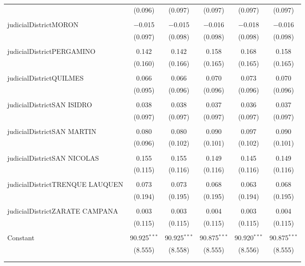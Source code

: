 \documentclass{article}
\begin{document}
\begin{table}[!htbp]
{\begin{tabular}{@{\extracolsep{5pt}}lccccc}
  & (0.096) & (0.097) & (0.097) & (0.097) & (0.097) \\ 
  & & & & & \\ 
 judicialDistrictMORON & $-$0.015 & $-$0.015 & $-$0.016 & $-$0.018 & $-$0.016 \\ 
  & (0.097) & (0.098) & (0.098) & (0.098) & (0.098) \\ 
  & & & & & \\ 
 judicialDistrictPERGAMINO & 0.142 & 0.142 & 0.158 & 0.168 & 0.158 \\ 
  & (0.160) & (0.166) & (0.165) & (0.165) & (0.165) \\ 
  & & & & & \\ 
 judicialDistrictQUILMES & 0.066 & 0.066 & 0.070 & 0.073 & 0.070 \\ 
  & (0.095) & (0.096) & (0.096) & (0.096) & (0.096) \\ 
  & & & & & \\ 
 judicialDistrictSAN ISIDRO & 0.038 & 0.038 & 0.037 & 0.036 & 0.037 \\ 
  & (0.097) & (0.097) & (0.097) & (0.097) & (0.097) \\ 
  & & & & & \\ 
 judicialDistrictSAN MARTIN & 0.080 & 0.080 & 0.090 & 0.097 & 0.090 \\ 
  & (0.096) & (0.102) & (0.101) & (0.102) & (0.101) \\ 
  & & & & & \\ 
 judicialDistrictSAN NICOLAS & 0.155 & 0.155 & 0.149 & 0.145 & 0.149 \\ 
  & (0.115) & (0.116) & (0.116) & (0.116) & (0.116) \\ 
  & & & & & \\ 
 judicialDistrictTRENQUE LAUQUEN & 0.073 & 0.073 & 0.068 & 0.063 & 0.068 \\ 
  & (0.194) & (0.195) & (0.195) & (0.194) & (0.195) \\ 
  & & & & & \\ 
 judicialDistrictZARATE CAMPANA & 0.003 & 0.003 & 0.004 & 0.003 & 0.004 \\ 
  & (0.115) & (0.115) & (0.115) & (0.115) & (0.115) \\ 
  & & & & & \\ 
 Constant & 90.925$^{***}$ & 90.925$^{***}$ & 90.875$^{***}$ & 90.920$^{***}$ & 90.875$^{***}$ \\ 
  & (8.555) & (8.558) & (8.555) & (8.556) & (8.555) \\ 
  & & & & & \\ 
\hline \\[-1.8ex] 

\end{tabular}}
\end{table}
\end{document}
